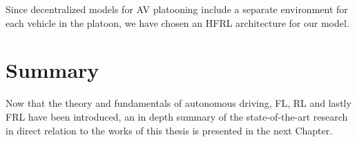 Since decentralized models for AV platooning include a separate environment for each
vehicle in the platoon, we have chosen an HFRL architecture for our model.

\section{Summary}
Now that the theory and fundamentals of autonomous driving, FL, RL and lastly FRL
have been introduced, an in depth summary of the state-of-the-art research in
direct relation to the works of this thesis is presented in the next Chapter.